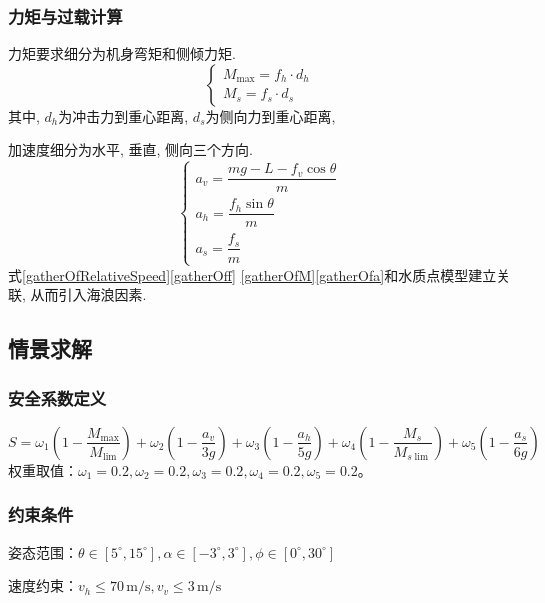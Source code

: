 \documentclass{cumcmthesis}
\begin{document}
\subsubsection{力矩与过载计算}

力矩要求细分为机身弯矩和侧倾力矩.
\begin{equation}
    \begin{cases}
        M_{\text{max}} = f_h \cdot d_h  \\
        M_s = f_s \cdot d_s
    \end{cases}
    \label{gatherOfM}
\end{equation}
其中, $d_h$为冲击力到重心距离, $d_s$为侧向力到重心距离, 

加速度细分为水平, 垂直, 侧向三个方向. 
\begin{equation}
    \begin{cases}
    a_v = \dfrac{mg - L - f_v \cos\theta}{m} \\
    a_h = \dfrac{f_h \sin\theta}{m} \\
    a_s = \dfrac{f_s}{m}
    \end{cases}
    \label{gatherOfa}
\end{equation}
式\eqref{gatherOfRelativeSpeed}\eqref{gatherOff}
\eqref{gatherOfM}\eqref{gatherOfa}和水质点模型建立关联, 
从而引入海浪因素. 

\subsection{情景求解}


\subsubsection{安全系数定义}
\[
S = \omega_1\left(1 - \frac{M_{\text{max}}}{M_{\lim}}\right) + 
\omega_2\left(1 - \frac{a_v}{3g}\right) + \omega_3\left(1 - \frac{a_h}{5g}\right) 
+ \omega_4\left(1 - \frac{M_s}{M_{s\lim}}\right) + \omega_5\left(1 - 
\frac{a_s}{6g}\right)
\]
权重取值：$\omega_1=0.2, \omega_2=0.2, \omega_3=0.2, \omega_4=0.2, \omega_5=0.2$。

\subsubsection{约束条件}

姿态范围：$\theta \in [5^\circ, 15^\circ], \alpha \in [-3^\circ, 3^\circ], \phi \in [0^\circ, 30^\circ]$

速度约束：$v_h \leq 70\,\text{m/s}, v_v \leq 3\,\text{m/s}$
\end{document}
